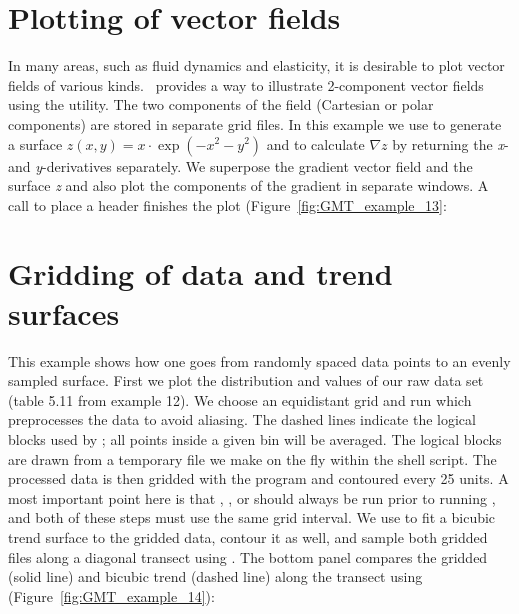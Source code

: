 

\section{Plotting of vector fields}

In many areas, such as fluid dynamics and elasticity,
it is desirable to plot vector fields of various kinds.
\GMT\ provides a way to illustrate 2-component vector fields
using the  utility.  The two components of
the field (Cartesian or polar components) are stored in
separate grid files.  In this example we use 
to generate a surface $z(x, y) = x \cdot \exp(-x^2 -y^2)$
and to calculate $\nabla z$ by
returning the {\it x}- and {\it y}-derivatives separately.
We superpose the gradient vector field and the surface
{\it z} and also plot the components of the gradient
in separate windows.
A  call to place a header finishes the plot
(Figure~\ref{fig:GMT_example_13}:



\section{Gridding of data and trend surfaces}

This example shows how one goes from randomly spaced data
points to an evenly sampled surface.  First we plot the
distribution and values of our raw data set (table 5.11
from example 12).  We choose an equidistant grid and run
 which preprocesses the data to avoid aliasing.
The dashed lines indicate the logical blocks used by
; all points inside a given bin will be averaged.
The logical blocks are drawn from a temporary file we make on
the fly within the shell script.  The processed data is then
gridded with the  program and contoured every 25
units.  A most important point here is that ,
, or  should always be run
prior to running , and both of these steps must use the same
grid interval.  We use  to fit a bicubic trend
surface to the gridded data, contour it as well, and sample
both gridded files along a diagonal transect using .
The bottom panel compares the gridded (solid line) and bicubic
trend (dashed line) along the transect using 
(Figure~\ref{fig:GMT_example_14}):

